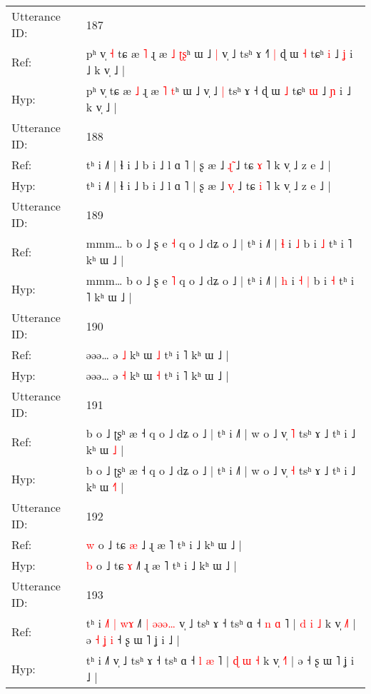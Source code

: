 \documentclass[10pt]{article}
\DeclareRobustCommand{\hl}[1]{{\textcolor{red}{#1}}}
\begin{document}
\begin{longtable}{ll}
 \\
\midrule
Utterance ID: & 187 \\
Ref: & pʰ v̩\hl{ }\hl{˧} tɕ æ \hl{˥} ɻ æ \hl{˩} \hl{ʈ}\hl{ʂ}ʰ ɯ ˩\hl{ }\hl{|} v̩ ˩\hl{}\hl{} tsʰ ɤ ˧\hl{˥}\hl{ }\hl{|} ɖ ɯ \hl{˧} tɕʰ \hl{i} ˩ \hl{ʝ} i ˩ k v̩ ˩ |
 \\
Hyp: & pʰ v̩\hl{}\hl{} tɕ æ \hl{˩} ɻ æ \hl{˥} \hl{}\hl{t}ʰ ɯ ˩\hl{}\hl{} v̩ ˩\hl{ }\hl{|} tsʰ ɤ ˧\hl{}\hl{}\hl{} ɖ ɯ \hl{˩} tɕʰ \hl{ɯ} ˩ \hl{ɲ} i ˩ k v̩ ˩ |
 \\
\midrule
Utterance ID: & 188 \\
Ref: & tʰ i ˩˥ | ɬ i ˩ b i ˩ l ɑ ˥ | ʂ æ ˩ \hl{ɻ}\hl{̃} ˩ tɕ \hl{ɤ} ˥ k v̩ ˩ z e ˩ |
 \\
Hyp: & tʰ i ˩˥ | ɬ i ˩ b i ˩ l ɑ ˥ | ʂ æ ˩ \hl{v}\hl{̩} ˩ tɕ \hl{i} ˥ k v̩ ˩ z e ˩ |
 \\
\midrule
Utterance ID: & 189 \\
Ref: & mmm… b o ˩ ʂ e \hl{˧} q o ˩ dʑ o ˩ | tʰ i ˩˥ | \hl{ɬ} i\hl{}\hl{} \hl{˩} b i \hl{˩} tʰ i ˥ kʰ ɯ ˩ |
 \\
Hyp: & mmm… b o ˩ ʂ e \hl{˥} q o ˩ dʑ o ˩ | tʰ i ˩˥ | \hl{h} i\hl{ }\hl{˧} \hl{|} b i \hl{˧} tʰ i ˥ kʰ ɯ ˩ |
 \\
\midrule
Utterance ID: & 190 \\
Ref: & əəə… ə \hl{˩} kʰ ɯ \hl{˩} tʰ i ˥ kʰ ɯ ˩ |
 \\
Hyp: & əəə… ə \hl{˧} kʰ ɯ \hl{˧} tʰ i ˥ kʰ ɯ ˩ |
 \\
\midrule
Utterance ID: & 191 \\
Ref: & b o ˩ ʈʂʰ æ ˧ q o ˩ dʑ o ˩ | tʰ i ˩˥ | w o ˩ v̩ \hl{˥} tsʰ ɤ ˩ tʰ i ˩ kʰ ɯ \hl{}\hl{˩} |
 \\
Hyp: & b o ˩ ʈʂʰ æ ˧ q o ˩ dʑ o ˩ | tʰ i ˩˥ | w o ˩ v̩ \hl{˧} tsʰ ɤ ˩ tʰ i ˩ kʰ ɯ \hl{˧}\hl{˥} |
 \\
\midrule
Utterance ID: & 192 \\
Ref: & \hl{w} o ˩ tɕ \hl{æ} ˩\hl{} ɻ æ ˥ tʰ i ˩ kʰ ɯ ˩ |
 \\
Hyp: & \hl{b} o ˩ tɕ \hl{ɤ} ˩\hl{˥} ɻ æ ˥ tʰ i ˩ kʰ ɯ ˩ |
 \\
\midrule
Utterance ID: & 193 \\
Ref: & tʰ i\hl{ }\hl{˩}\hl{˥}\hl{ }\hl{|}\hl{ }\hl{w}\hl{ɤ} ˩˥\hl{ }\hl{|}\hl{ }\hl{ə}\hl{ə}\hl{ə}\hl{…} v̩ ˩ tsʰ ɤ ˧ tsʰ ɑ ˧ \hl{n} \hl{ɑ} ˥ | \hl{d} \hl{i} \hl{˩} k v̩ \hl{˩}˥ | ə\hl{ }\hl{˧}\hl{ }\hl{ʝ}\hl{ }\hl{i} ˧ ʂ ɯ ˥ ʝ i ˩ |
 \\
Hyp: & tʰ i\hl{}\hl{}\hl{}\hl{}\hl{}\hl{}\hl{}\hl{} ˩˥\hl{}\hl{}\hl{}\hl{}\hl{}\hl{}\hl{} v̩ ˩ tsʰ ɤ ˧ tsʰ ɑ ˧ \hl{l} \hl{æ} ˥ | \hl{ɖ} \hl{ɯ} \hl{˧} k v̩ \hl{˧}˥ | ə\hl{}\hl{}\hl{}\hl{}\hl{}\hl{} ˧ ʂ ɯ ˥ ʝ i ˩ |

\end{longtable}
\end{document}
